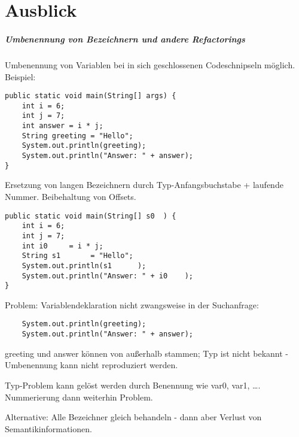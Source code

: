 \chapter{Ausblick}\label{ch:future-work}


\paragraph{Umbenennung von Bezeichnern und andere Refactorings}


Umbenennung von Variablen bei in sich geschlossenen Codeschnipseln möglich.
Beispiel:

\begin{verbatim}
public static void main(String[] args) {
    int i = 6;
    int j = 7;
    int answer = i * j;
    String greeting = "Hello";
    System.out.println(greeting);
    System.out.println("Answer: " + answer);
}
\end{verbatim}

Ersetzung von langen Bezeichnern durch Typ-Anfangsbuchstabe + laufende Nummer.
Beibehaltung von Offsets.

\begin{verbatim}
public static void main(String[] s0  ) {
    int i = 6;
    int j = 7;
    int i0     = i * j;
    String s1       = "Hello";
    System.out.println(s1      );
    System.out.println("Answer: " + i0    );
}
\end{verbatim}

Problem: Variablendeklaration nicht zwangsweise in der Suchanfrage:

\begin{verbatim}
    System.out.println(greeting);
    System.out.println("Answer: " + answer);
\end{verbatim}

greeting und answer können von außerhalb stammen;
Typ ist nicht bekannt -
Umbenennung kann nicht reproduziert werden.

Typ-Problem kann gelöst werden durch Benennung wie var0, var1, \ldots.
Nummerierung dann weiterhin Problem.

Alternative: Alle Bezeichner gleich behandeln - dann aber Verlust von Semantikinformationen.
